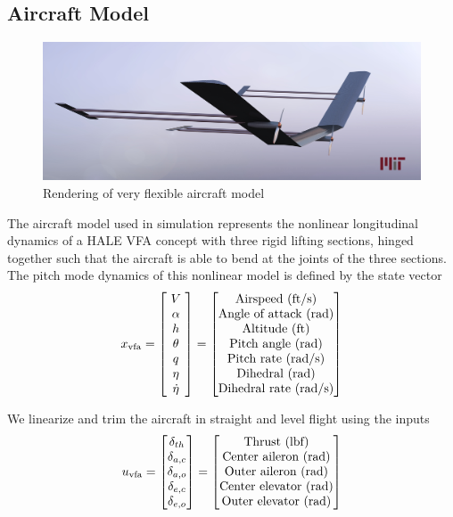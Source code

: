 \documentclass[english]{ifacconf}
\begin{document}
\subsection{Aircraft Model}\label{subsec:vfa_model}
\begin{figure}[htbp]
	\centering
	\includegraphics[width=0.95\columnwidth]{../fig/VFA_16.jpg}
	\caption{Rendering of very flexible aircraft model}
	\label{fig:vfa}
\end{figure}

The aircraft model used in simulation represents the nonlinear longitudinal dynamics of a HALE VFA concept with three rigid lifting sections, hinged together such that the aircraft is able to bend at the joints of the three sections. The pitch mode dynamics of this nonlinear model is defined by the state vector
\begin{equation}
x_{\text{vfa}} = \begin{bmatrix}
~V~\\
\alpha \\
h \\
\theta \\
q\\
\eta\\
\dot{\eta}
\end{bmatrix} =
\begin{bmatrix}
	 $Airspeed (ft/s)$\\ $Angle of attack (rad)$\\ $Altitude (ft)$\\ $Pitch angle (rad)$\\ $Pitch rate (rad/s)$\\ $Dihedral (rad)$\\ $Dihedral rate (rad/s)$
\end{bmatrix}
\end{equation}

We linearize and trim the aircraft in straight and level flight using the inputs
\begin{equation}
	u_{\text{vfa}} = \begin{bmatrix}
\delta_{th} \\
\delta_{a,c} \\
\delta_{a,o} \\
\delta_{e,c} \\
\delta_{e,o} 
\end{bmatrix} = \begin{bmatrix}
		$Thrust (lbf)$\\
		$Center aileron (rad)$\\
		$Outer aileron (rad)$\\
		$Center elevator (rad)$\\
		$Outer elevator (rad)$
	\end{bmatrix}
\end{equation}
\end{document}
